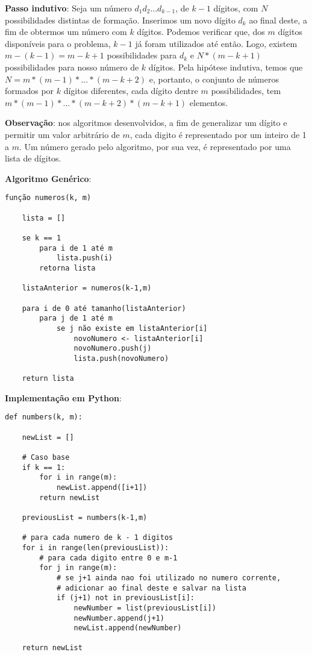 \documentclass{article}
\begin{document}
\textbf{Passo indutivo}: Seja um número $d_1d_2...d_{k-1}$, de $k-1$ dígitos, com $N$ possibilidades distintas de formação. Inserimos um novo dígito $d_k$ ao final deste, a fim de obtermos um número com $k$ dígitos. Podemos verificar que, dos $m$ dígitos disponíveis para o problema, $k-1$ já foram utilizados até então. Logo, existem $m-(k-1) = m-k+1$ possibilidades para $d_k$ e $N*(m-k+1)$ possibilidades para nosso número de $k$ dígitos.
Pela hipótese indutiva, temos que $N = m * (m-1) * ... * (m-k+2)$ e, portanto, o conjunto de números formados por $k$ dígitos diferentes, cada dígito dentre $m$ possibilidades, tem $ m * (m-1) * ... * (m-k+2) * (m-k+1)$ elementos.

\textbf{Observação}: nos algoritmos desenvolvidos, a fim de generalizar um dígito e permitir um valor arbitrário de $m$, cada digito é representado por um inteiro de 1 a $m$. Um número gerado pelo algoritmo, por sua vez, é representado por uma lista de dígitos.

\textbf{Algoritmo Genérico}:

{\color{ogreen}
\begin{verbatim}
função numeros(k, m)

    lista = []

    se k == 1
        para i de 1 até m
            lista.push(i)
        retorna lista

    listaAnterior = numeros(k-1,m)

    para i de 0 até tamanho(listaAnterior)
        para j de 1 até m
            se j não existe em listaAnterior[i]
                novoNumero <- listaAnterior[i]
                novoNumero.push(j)
                lista.push(novoNumero)

    return lista
\end{verbatim}
}

\textbf{Implementação em Python}:

{\color{red}
\begin{verbatim}
def numbers(k, m):

    newList = []

    # Caso base
    if k == 1:
        for i in range(m):
            newList.append([i+1])
        return newList

    previousList = numbers(k-1,m)

    # para cada numero de k - 1 digitos
    for i in range(len(previousList)):
        # para cada digito entre 0 e m-1
        for j in range(m):
            # se j+1 ainda nao foi utilizado no numero corrente,
            # adicionar ao final deste e salvar na lista
            if (j+1) not in previousList[i]:
                newNumber = list(previousList[i])
                newNumber.append(j+1)
                newList.append(newNumber)

    return newList
\end{verbatim}
}
\end{document}
